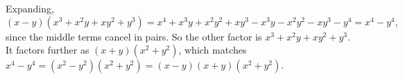 Expanding,
\[
(x-y)(x^3+x^2y+xy^2+y^3)=x^4+x^3y+x^2y^2+xy^3-x^3y-x^2y^2-xy^3-y^4=x^4-y^4,
\]
since the middle terms cancel in pairs. So the other factor is $\boxed{x^3+x^2y+xy^2+y^3}$. It factors further as $(x+y)(x^2+y^2)$, which matches $x^4-y^4=(x^2-y^2)(x^2+y^2)=(x-y)(x+y)(x^2+y^2)$.
